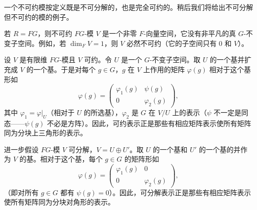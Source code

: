 一个不可约模按定义既是不可分解的，也是完全可约的。稍后我们将给出不可分解但不可约的模的例子。

若 $R=FG$，则不可约 $FG$-模 $V$ 是一个非零 $F$-向量空间，它没有非平凡的真 $G$-不变子空间。例如，若 $\dim_F V=1$，则 $V$ 必然不可约（它的子空间只有 $0$ 和 $V$）。

设 $V$ 是有限维 $FG$-模且 $V$ 可约。令 $U$ 是一个 $G$-不变子空间。取 $U$ 的一个基并扩充成 $V$ 的一个基。于是对每个 $g\in G$，$g$ 在 $V$ 上作用的矩阵 $\varphi(g)$ 相对于这个基形如
\[
  \varphi(g)=\begin{pmatrix}
  \varphi_1(g)&\psi(g)\\
  0&\varphi_2(g)
  \end{pmatrix},
\]
其中 $\varphi_1=\varphi|_U$（相对于 $U$ 的所选基），$\varphi_2$ 是 $G$ 在 $V/U$ 上的表示（$\psi$ 不一定是同态——$\psi(g)$ 不必是方阵）。因此，可约表示正是那些有相应矩阵表示使所有矩阵同为分块上三角形的表示。

进一步假设 $FG$-模 $V$ 可分解，$V=U\oplus U'$。取 $U$ 的一个基和 $U'$ 的一个基的并作为 $V$ 的基。相对于这个基，每个 $g\in G$ 的矩阵形如
\[
  \varphi(g)=\begin{pmatrix}
  \varphi_1(g)&0\\
  0&\varphi_2(g)
  \end{pmatrix},
\]
（即对所有 $g\in G$ 都有 $\psi(g)=0$）。因此，可分解表示正是那些有相应矩阵表示使所有矩阵同为分块对角形的表示。

